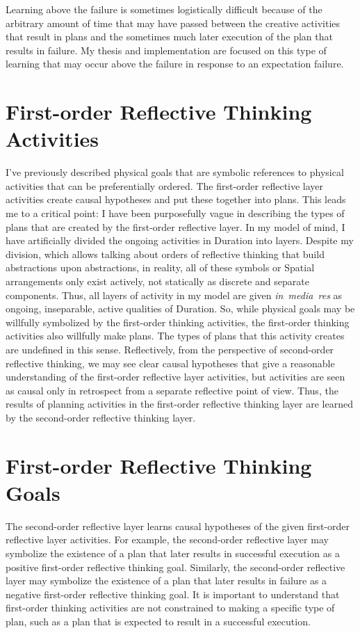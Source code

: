 Learning above the failure is sometimes logistically difficult because
of the arbitrary amount of time that may have passed between the
creative activities that result in plans and the sometimes much later
execution of the plan that results in failure.  My thesis and
implementation are focused on this type of learning that may occur
above the failure in response to an expectation failure.

\section{First-order Reflective Thinking Activities}

I've previously described physical goals that are symbolic references
to physical activities that can be preferentially ordered.  The
first-order reflective layer activities create causal hypotheses and
put these together into plans.  This leads me to a critical point: I
have been purposefully vague in describing the types of plans that are
created by the first-order reflective layer.  In my model of mind, I
have artificially divided the ongoing activities in Duration into
layers.  Despite my division, which allows talking about orders of
reflective thinking that build abstractions upon abstractions, in
reality, all of these symbols or Spatial arrangements only exist
actively, not statically as discrete and separate components.  Thus,
all layers of activity in my model are given \emph{in~media~res} as
ongoing, inseparable, active qualities of Duration.  So, while
physical goals may be willfully symbolized by the first-order thinking
activities, the first-order thinking activities also willfully make
plans.  The types of plans that this activity creates are undefined in
this sense.  Reflectively, from the perspective of second-order
reflective thinking, we may see clear causal hypotheses that give a
reasonable understanding of the first-order reflective layer
activities, but activities are seen as causal only in retrospect from
a separate reflective point of view.  Thus, the results of planning
activities in the first-order reflective thinking layer are learned by
the second-order reflective thinking layer.

\section{First-order Reflective Thinking Goals}

The second-order reflective layer learns causal hypotheses of the
given first-order reflective layer activities.  For example, the
second-order reflective layer may symbolize the existence of a plan
that later results in successful execution as a positive first-order
reflective thinking goal.  Similarly, the second-order reflective
layer may symbolize the existence of a plan that later results in
failure as a negative first-order reflective thinking goal.  It is
important to understand that first-order thinking activities are not
constrained to making a specific type of plan, such as a plan that is
expected to result in a successful execution.

